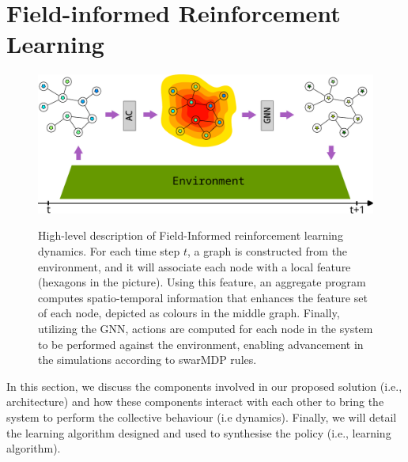 \documentclass[conference]{IEEEtran}
\begin{document}
\section{Field-informed Reinforcement Learning}
\label{sec:approach}
\begin{figure}
  \includegraphics[width=\linewidth]{imgs/architecture.pdf}
  \label{fig:architecture}
  \caption{High-level description of Field-Informed reinforcement learning dynamics. 
  For each time step $t$, a graph is constructed from the environment, and it will associate each node with a local feature (hexagons in the picture). 
  Using this feature, an aggregate program computes spatio-temporal information that enhances the feature set of each node, depicted as colours in the middle graph. 
  Finally, utilizing the GNN, actions are computed for each node in the system to be performed against the environment, enabling advancement in the simulations according to swarMDP rules.
}
\end{figure}
In this section, we discuss the components involved in our proposed solution (i.e., architecture) and how these components interact with each other to bring the system to perform the collective behaviour (i.e dynamics). Finally, we will detail the learning algorithm designed and used to synthesise the policy (i.e., learning algorithm).
\end{document}
